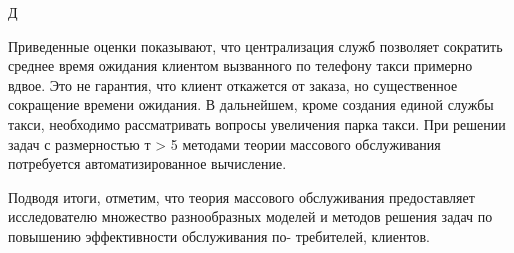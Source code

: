 Д

Приведенные оценки показывают, что централизация служб позволяет сократить среднее время ожидания клиентом вызванного по телефону такси примерно вдвое. Это не гарантия, что клиент откажется от заказа, но существенное сокращение времени ожидания. В дальнейшем, кроме создания единой службы такси, необходимо рассматривать вопросы увеличения парка такси. При решении задач с размерностью т > 5 методами теории массового обслуживания потребуется автоматизированное вычисление.

Подводя итоги, отметим, что теория массового обслуживания предоставляет исследователю множество разнообразных моделей и методов решения задач по повышению эффективности обслуживания по-
требителей, клиентов.